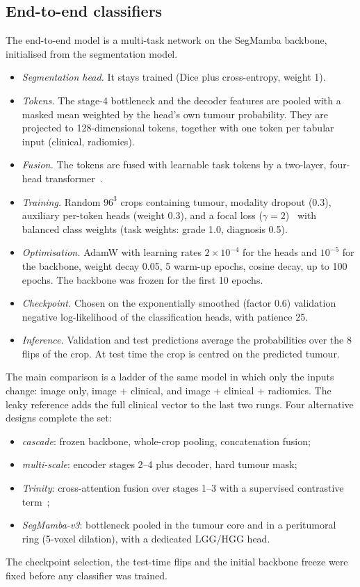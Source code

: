 \documentclass[11pt]{article}
\begin{document}
\subsection{End-to-end classifiers}
\label{sec:e2e}
The end-to-end model is a multi-task network on the SegMamba backbone, initialised from the segmentation model.
\begin{itemize}
  \item \emph{Segmentation head.} It stays trained (Dice plus cross-entropy, weight 1).
  \item \emph{Tokens.} The stage-4 bottleneck and the decoder features are pooled with a masked mean weighted by the
        head's own tumour probability. They are projected to 128-dimensional tokens, together with one token per
        tabular input (clinical, radiomics).
  \item \emph{Fusion.} The tokens are fused with learnable task tokens by a two-layer, four-head
        transformer~\cite{vaswani2017attention}.
  \item \emph{Training.} Random $96^3$ crops containing tumour, modality dropout (0.3), auxiliary per-token heads
        (weight 0.3), and a focal loss ($\gamma = 2$)~\cite{lin2017focal} with balanced class weights (task weights:
        grade 1.0, diagnosis 0.5).
  \item \emph{Optimisation.} AdamW with learning rates $2 \times 10^{-4}$ for the heads and $10^{-5}$ for the
        backbone, weight decay 0.05, 5 warm-up epochs, cosine decay, up to 100 epochs. The backbone was frozen for
        the first 10 epochs.
  \item \emph{Checkpoint.} Chosen on the exponentially smoothed (factor 0.6) validation negative log-likelihood of
        the classification heads, with patience 25.
  \item \emph{Inference.} Validation and test predictions average the probabilities over the 8 flips of the crop.
        At test time the crop is centred on the predicted tumour.
\end{itemize}

The main comparison is a ladder of the same model in which only the inputs change: image only, image + clinical,
and image + clinical + radiomics. The leaky reference adds the full clinical vector to the last two rungs. Four
alternative designs complete the set:
\begin{itemize}
  \item \emph{cascade}: frozen backbone, whole-crop pooling, concatenation fusion;
  \item \emph{multi-scale}: encoder stages 2--4 plus decoder, hard tumour mask;
  \item \emph{Trinity}: cross-attention fusion over stages 1--3 with a supervised contrastive term~\cite{khosla2020supcon};
  \item \emph{SegMamba-v3}: bottleneck pooled in the tumour core and in a peritumoral ring (5-voxel dilation), with
        a dedicated LGG/HGG head.
\end{itemize}
The checkpoint selection, the test-time flips and the initial backbone freeze were fixed before any classifier was
trained.
\end{document}
